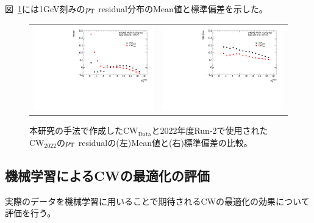 図~\ref{residual_MC}には1GeV刻みの$p_{\rm{T}}$ residual分布のMean値と標準偏差を示した。
\begin{figure}
    \begin{tabular}{cc}
    \begin{minipage}[b]{0.45\hsize}
        \hspace*{-1cm}
        \includegraphics[clip, width=8cm]{fig/5/residual_mean_Data.pdf}
        \subcaption{}
        \label{fig:resi_mean_Data}
    \end{minipage}&
    \begin{minipage}[b]{0.45\hsize}
        \includegraphics[clip, width=8cm]{fig/5/residual_stdDeVpdf.pdf}
        \subcaption{}
        \label{fig:resi_std_Data}
    \end{minipage}
    \end{tabular}
    \caption{本研究の手法で作成した$\mathrm{CW_{Data}}$と2022年度Run-2で使用された$\mathrm{CW_{2022}}$の$p_{\rm{T}}$ residualの(左)Mean値と(右)標準偏差の比較。}
    \label{residual_MC}
\end{figure}





\subsection{機械学習によるCWの最適化の評価}
実際のデータを機械学習に用いることで期待されるCWの最適化の効果について評価を行う。


